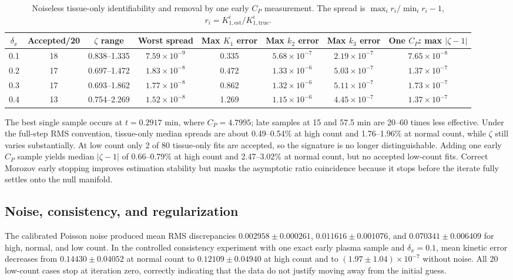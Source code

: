 \documentclass[sigconf,nonacm]{acmart}
\begin{document}
\begin{table}[t]
\caption{Noiseless tissue-only identifiability and removal by one early $C_P$ measurement. The spread is $\max_i r_i/\min_i r_i-1$, $r_i=K_{1,\mathrm{est}}^i/K_{1,\mathrm{true}}^i$.}
\label{tab:identifiability}
\small
\begin{tabular}{cccccccc}
\toprule
$\delta_x$ & Accepted/20 & $\zeta$ range & Worst spread & Max $K_1$ error & Max $k_2$ error & Max $k_3$ error & One $C_P$: max $|\zeta-1|$ \\
\midrule
0.1 & 18 & 0.838--1.335 & $7.59\times10^{-9}$ & 0.335 & $5.68\times10^{-7}$ & $2.19\times10^{-7}$ & $7.65\times10^{-8}$ \\
0.2 & 17 & 0.697--1.472 & $1.83\times10^{-8}$ & 0.472 & $1.33\times10^{-6}$ & $5.03\times10^{-7}$ & $1.37\times10^{-7}$ \\
0.3 & 17 & 0.693--1.862 & $1.77\times10^{-8}$ & 0.862 & $1.32\times10^{-6}$ & $5.11\times10^{-7}$ & $1.73\times10^{-7}$ \\
0.4 & 13 & 0.754--2.269 & $1.52\times10^{-8}$ & 1.269 & $1.15\times10^{-6}$ & $4.45\times10^{-7}$ & $1.37\times10^{-7}$ \\
\bottomrule
\end{tabular}
\end{table}

The best single sample occurs at $t=0.2917$ min, where $C_P=4.7995$; late samples at 15 and 57.5 min are 20--60 times less effective. Under the full-step RMS convention, tissue-only median spreads are about 0.49--0.54\% at high count and 1.76--1.96\% at normal count, while $\zeta$ still varies substantially. At low count only 2 of 80 tissue-only fits are accepted, so the signature is no longer distinguishable. Adding one early $C_P$ sample yields median $|\zeta-1|$ of 0.66--0.79\% at high count and 2.47--3.02\% at normal count, but no accepted low-count fits. Correct Morozov early stopping improves estimation stability but masks the asymptotic ratio coincidence because it stops before the iterate fully settles onto the null manifold.

\subsection{Noise, consistency, and regularization}

The calibrated Poisson noise produced mean RMS discrepancies $0.002958\pm0.000261$, $0.011616\pm0.001076$, and $0.070341\pm0.006409$ for high, normal, and low count. In the controlled consistency experiment with one exact early plasma sample and $\delta_x=0.1$, mean kinetic error decreases from $0.14430\pm0.04052$ at normal count to $0.12109\pm0.04940$ at high count and to $(1.97\pm1.04)\times10^{-7}$ without noise. All 20 low-count cases stop at iteration zero, correctly indicating that the data do not justify moving away from the initial guess.
\end{document}
